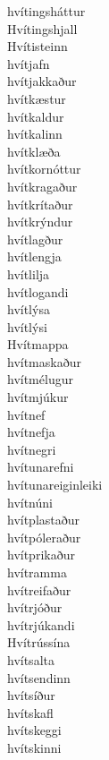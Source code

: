 \documentclass[../samsetningasafn.tex]{subfiles}
\begin{document}
\begin{bigwordlist}
\begin{footnotesize}
\begin{multicols}{4}
\begin{description}
		\item [hvítingsháttur]
		\item [Hvítingshjall]
		\item [Hvítisteinn]
		\item [hvítjafn]
		\item [hvítjakkaður]
		\item [hvítkæstur]
		\item [hvítkaldur]
		\item [hvítkalinn]
		\item [hvítklæða]
		\item [hvítkornóttur]
		\item [hvítkragaður]
		\item [hvítkrítaður]
		\item [hvítkrýndur]
		\item [hvítlagður]
		\item [hvítlengja]
		\item [hvítlilja]
		\item [hvítlogandi]
		\item [hvítlýsa]
		\item [hvítlýsi]
		\item [Hvítmappa]
		\item [hvítmaskaður]
		\item [hvítmélugur]
		\item [hvítmjúkur]
		\item [hvítnef]
		\item [hvítnefja]
		\item [hvítnegri]
		\item [hvítunarefni]
		\item [hvítunareiginleiki]
		\item [hvítnúni]
		\item [hvítplastaður]
		\item [hvítpóleraður]
		\item [hvítprikaður]
		\item [hvítramma]
		\item [hvítreifaður]
		\item [hvítrjóður]
		\item [hvítrjúkandi]
		\item [Hvítrússína]
		\item [hvítsalta]
		\item [hvítsendinn]
		\item [hvítsíður]
		\item [hvítskafl]
		\item [hvítskeggi]
		\item [hvítskinni]

\end{description}
\end{multicols}
\end{footnotesize}
\end{bigwordlist}
\end{document}
